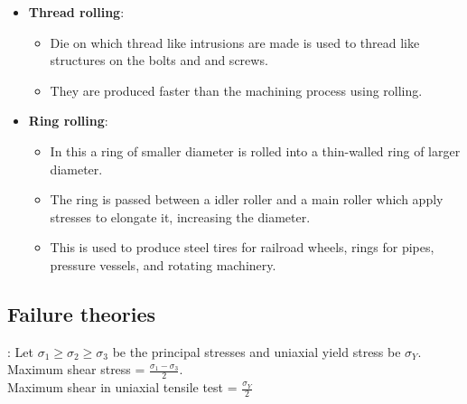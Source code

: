 \documentclass{article}
\begin{document}
\begin{itemize}
			\item \textbf{Thread rolling}: 
			\begin{itemize}
				\item Die on which thread like intrusions are made is used to thread like structures on the bolts and and screws. 
				\item They are produced faster than the machining process using rolling.
			\end{itemize}

			\item \textbf{Ring rolling}: 
			\begin{itemize}
				\item In this a ring of smaller diameter is rolled into a thin-walled ring of larger diameter.
				\item The ring is passed between a idler roller and a main roller which apply stresses to elongate it, increasing the diameter. 
				\item This is used to produce steel tires for railroad wheels, rings for pipes, pressure vessels, and rotating machinery.
			\end{itemize}
		\end{itemize}

		\subsection{Failure theories}:
			Let $\sigma_1\geq \sigma_2 \geq \sigma_3$ be the principal stresses and uniaxial yield stress be $\sigma_Y$.\\
			Maximum shear stress = $\frac{\sigma_1 - \sigma_3}{2}$.\\
			Maximum shear in uniaxial tensile test = $\frac{\sigma_Y}{2}$
\end{document}
